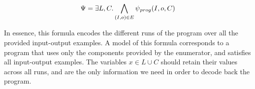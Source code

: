 \[
  \Psi{} = \exists L,C\ldotp \bigwedge_{(I, o) \in E}\psi{}_{prog}(I, o, C)
\]

\noindent
In essence, this formula encodes the different runs of the program over all
the provided input-output examples. A model of this formula corresponds to a
program that uses only the components provided by the enumerator, and satisfies
all input-output examples. The variables $x \in L \cup C$ should retain their
values across all runs, and are the only information we need in order to decode
back the program.







